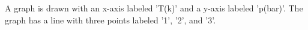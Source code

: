 A graph is drawn with an x-axis labeled 'T(k)' and a y-axis labeled 'p(bar)'. The graph has a line with three points labeled '1', '2', and '3'.
